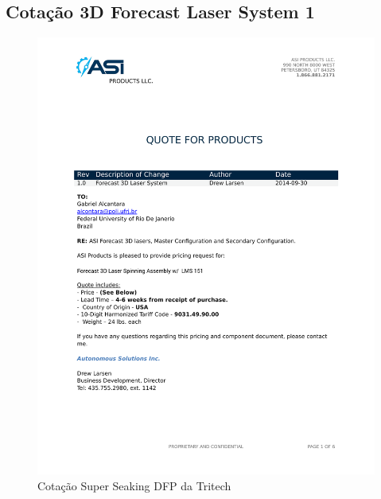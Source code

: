 \documentclass{article}
\begin{document}
\subsection{Cotação 3D Forecast Laser System 1 }
\begin{figure}[H]
 \centering
 \includegraphics[page=3,width=1\columnwidth]{figs/forecast/quote1.pdf}
 \caption{Cotação Super Seaking DFP da Tritech}
\end{figure}
\end{document}
